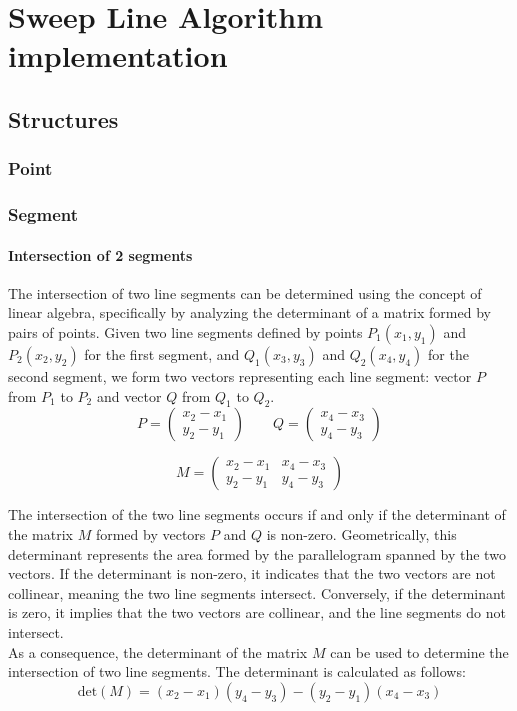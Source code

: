 \documentclass[10pt,a4paper,hidelinks]{article}
\begin{document}
\section{Sweep Line Algorithm implementation}
\subsection{Structures}
\subsubsection{Point}

\subsubsection{Segment}
\paragraph{Intersection of 2 segments}
The intersection of two line segments can be determined using the concept of linear algebra, specifically by analyzing the determinant of a matrix formed by pairs of points. Given two line segments defined by points $P_1(x_1, y_1)$ and $P_2(x_2, y_2)$ for the first segment, and $Q_1(x_3, y_3)$ and $Q_2(x_4, y_4)$ for the second segment, we form two vectors representing each line segment: vector $P$ from $P_1$ to $P_2$ and vector $Q$ from $Q_1$ to $Q_2$.\\
$$P = \begin{pmatrix}
x_2 - x_1\\
y_2 - y_1
\end{pmatrix}\qquad
Q = \begin{pmatrix}
x_4 - x_3\\
y_4 - y_3
\end{pmatrix}$$

$$M = \begin{pmatrix}
x_2 - x_1 & x_4 - x_3\\
y_2 - y_1 & y_4 - y_3
\end{pmatrix}$$

The intersection of the two line segments occurs if and only if the determinant of the matrix $M$ formed by vectors $P$ and $Q$ is non-zero. Geometrically, this determinant represents the area formed by the parallelogram spanned by the two vectors. If the determinant is non-zero, it indicates that the two vectors are not collinear, meaning the two line segments intersect. Conversely, if the determinant is zero, it implies that the two vectors are collinear, and the line segments do not intersect.\\
As a consequence, the determinant of the matrix $M$ can be used to determine the intersection of two line segments. The determinant is calculated as follows:
$$\mathrm{det}(M) = (x_2 - x_1)(y_4 - y_3) - (y_2 - y_1)(x_4 - x_3)$$
\end{document}
